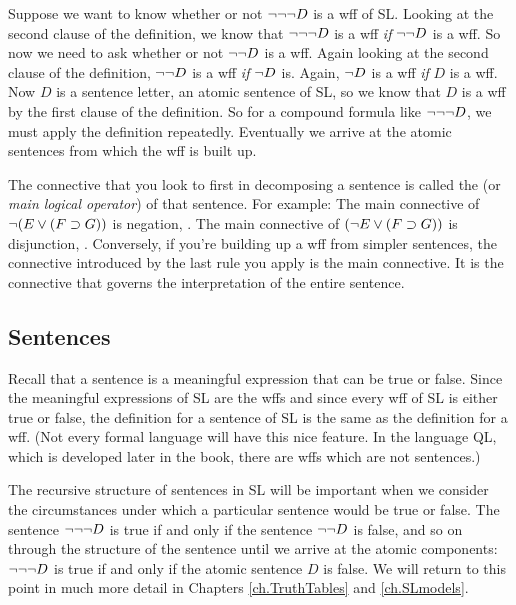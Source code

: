 Suppose we want to know whether or not $\neg \neg \neg D$ is a wff of SL. Looking at the second clause of the definition, we know that $\neg \neg \neg D$ is a wff \emph{if} $\neg \neg D$ is a wff. So now we need to ask whether or not $\neg \neg D$ is a wff. Again looking at the second clause of the definition, $\neg \neg D$ is a wff \emph{if} $\neg D$ is. Again, $\neg D$ is a wff \emph{if} $D$ is a wff. Now $D$ is a sentence letter, an atomic sentence of SL, so we know that $D$ is a wff by the first clause of the definition. So for a compound formula like $\neg \neg \neg D$, we must apply the definition repeatedly. Eventually we arrive at the atomic sentences from which the wff is built up.

The connective that you look to first in decomposing a sentence is called the  (or \emph{main logical operator}) of that sentence. For example: The main connective of $\neg (E \vee (F \supset G))$ is negation, \enot. The main connective of $(\neg E \vee (F \supset G))$ is disjunction, \eor. Conversely, if you're building up a wff from simpler sentences, the connective introduced by the last rule you apply is the main connective. It is the connective that governs the interpretation of the entire sentence.


\subsection{Sentences}
Recall that a sentence is a meaningful expression that can be true or false. Since the meaningful expressions of SL are the wffs and since every wff of SL is either true or false, the definition for a sentence of SL is the same as the definition for a wff. (Not every formal language will have this nice feature. In the language QL, which is developed later in the book, there are wffs which are not sentences.)

The recursive structure of sentences in SL will be important when we consider the circumstances under which a particular sentence would be true or false. The sentence $\neg \neg \neg D$ is true if and only if the sentence $\neg \neg D$ is false, and so on through the structure of the sentence until we arrive at the atomic components: $\neg \neg \neg D$ is true if and only if the atomic sentence $D$ is false. We will return to this point in much more detail in Chapters \ref{ch.TruthTables} and \ref{ch.SLmodels}.



